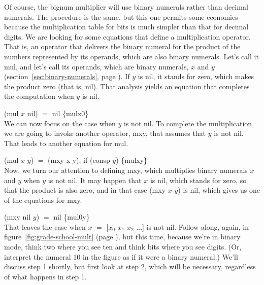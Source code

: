 Of course, the bignum multiplier
will use binary numerals rather than decimal numerals.
The procedure is the same, but this one permits some economies
because the multiplication table for bits is much simpler
than that for decimal digits.
We are looking for some equations that define a multiplication operator.
That is, an operator that delivers the binary numeral for the product of the numbers
represented by its operands, which are also binary numerals.
Let's call it \textsf{mul}, and let's call its operands, which are binary numerals,
$x$ and $y$ (section~\ref{sec:binary-numerals}, page \pageref{sec:binary-numerals}).
If $y$ is nil, it stands for zero,
which makes the product zero (that is, \textsf{nil}).
That analysis yields an equation that completes
the computation when $y$ is \textsf{nil}.

\vspace{2mm}\hspace*{2cm} \textsf{(mul $x$ nil)} $=$ \textsf{nil} \hspace{2cm} \hfill \{mulx0\}\\

We can now focus on the case when $y$ is not \textsf{nil}.
To complete the multiplication,
we are going to invoke another operator, \textsf{mxy},
that assumes that $y$ is not \textsf{nil}.
That leads to another equation for \textsf{mul}.

\vspace{2mm}\hspace*{2cm} \textsf{(mul $x$ $y$)} $=$ \textsf{(mxy x y)}, if \textsf{(consp $y$)} \hfill \{mulxy\}\\

Now, we turn our attention to defining \textsf{mxy}, which multiplies binary
numerals $x$ and $y$ when $y$ is not \textsf{nil}.
It may happen that $x$ is \textsf{nil}, which stands for zero, so that
the product is also zero, and in that case \textsf{(mxy $x$ $y$)} is \textsf{nil},
which gives us one of the equations for \textsf{mxy}.

\vspace{2mm}\hspace*{2cm} \textsf{(mxy nil $y$)} $=$ \textsf{nil}  \hfill \{mul0y\}\\

That leaves the case when $x$ $=$ \textsf{[$x_0$ $x_1$ $x_2$ ...]} is not \textsf{nil}.
Follow along, again,
in figure~\ref{fig:grade-school-mult} (page \pageref{fig:grade-school-mult}),
but this time, because we're in binary mode, think two where you see ten
and think bits where you see digits. (Or, interpret the numeral 10
in the figure as if it were a binary numeral.)
We'll discuss step 1 shortly, but first look at step 2,
which will be necessary, regardless of what happens in step 1.

